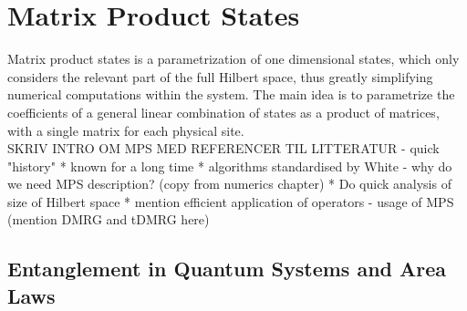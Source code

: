\chapter{Matrix Product States}
Matrix product states is a parametrization of one dimensional states, which only considers the relevant part of the full Hilbert space, thus greatly simplifying numerical computations within the system. The main idea is to parametrize the coefficients of a general linear combination of states as a product of matrices, with a single matrix for each physical site.\\
SKRIV INTRO OM MPS MED REFERENCER TIL LITTERATUR 
- quick "history"
   * known for a long time
   * algorithms standardised by White
- why do we need MPS description? (copy from numerics chapter)
   * Do quick analysis of size of Hilbert space
   * mention efficient application of operators
- usage of MPS (mention DMRG and tDMRG here)


\section{Entanglement in Quantum Systems and Area Laws}

